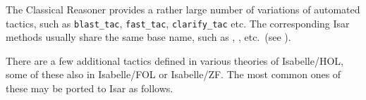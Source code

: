 \begin{isabellebody}
\begin{isamarkuptext}
\begin{tabular}{lll}
  \end{tabular}
  \medskip%
\end{isamarkuptext}%
\isamarkuptrue%
%
\isamarkuptrue%
%
\begin{isamarkuptext}%
The Classical Reasoner provides a rather large number of
  variations of automated tactics, such as \verb|blast_tac|, \verb|fast_tac|, \verb|clarify_tac| etc.  The corresponding Isar methods
  usually share the same base name, such as \hyperlink{method.blast}{\mbox{}}, \hyperlink{method.fast}{\mbox{}}, \hyperlink{method.clarify}{\mbox{}} etc.\ (see ).%
\end{isamarkuptext}%
\isamarkuptrue%
%
\isamarkuptrue%
%
\begin{isamarkuptext}%
There are a few additional tactics defined in various theories of
  Isabelle/HOL, some of these also in Isabelle/FOL or Isabelle/ZF.
  The most common ones of these may be ported to Isar as follows.


\end{isamarkuptext}
\end{isabellebody}
